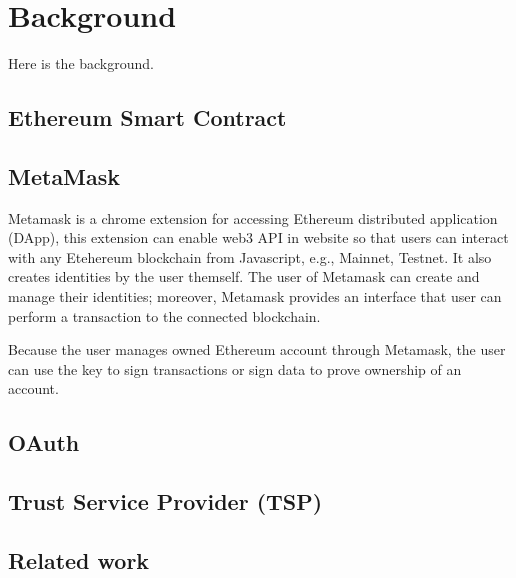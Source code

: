 \chapter{Background}
\label{chapter:background}

Here is the background.

\section{Ethereum Smart Contract}

\newpage
\section{MetaMask}
Metamask is a chrome extension for accessing Ethereum distributed application (DApp), this extension can enable web3 API in website so that users can interact with any Etehereum blockchain from Javascript, e.g., Mainnet, Testnet. It also creates identities by the user themself. The user of Metamask can create and manage their identities; moreover, Metamask provides an interface that user can perform a transaction to the connected blockchain.\par
Because the user manages owned Ethereum account through Metamask, the user can use the key to sign transactions or sign data to prove ownership of an account.\par
\newpage
\section{OAuth}

\section{Trust Service Provider (TSP)}

\section{Related work}
